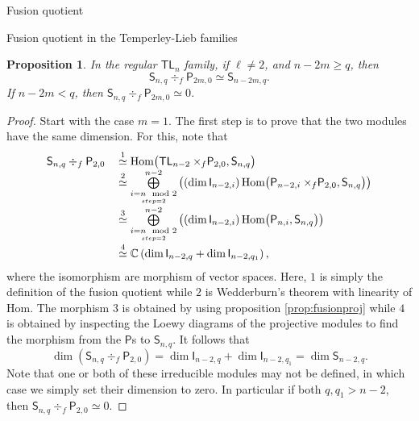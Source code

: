 \documentclass[reqno]{amsart}
\newtheorem{Prop}[Thm]{Proposition}
\newcommand{\tl}[1]{\mathsf{TL}_{#1}}
\newcommand{\ds}[1]{\mathsf S_{#1}}
\newcommand{\dl}[1]{\mathsf I_{#1}}
\newcommand{\dP}[1]{\mathsf P_{#1}}
\newcommand{\xf}{\times\hspace{-0.27em}_f}
\newcommand{\Hom}[1]{\text{\rm{Hom}}\big( #1 \big)}
\begin{document}
\begin{section}{Fusion quotient}
\begin{subsection}{Fusion quotient in the Temperley-Lieb families}
\begin{Prop}
In the regular $\tl{n}$ family, if $\ell \neq 2$, and $n- 2m \geq q $, then 
\begin{equation}
\ds{n,q}\div_{f} \dP{2m,0} \simeq \ds{n-2m,q}.
\end{equation}
If $n-2m < q$, then $\ds{n,q}\div_{f} \dP{2m,0}  \simeq 0$.
\end{Prop}
\begin{proof}
Start with the case $m=1$. The first step is to prove that the two modules have the same dimension. For this, note that
\begin{equation}
\begin{tabular}{r l}
 $\ds{n,q}\div_{f} \dP{2,0}$ &$ \overset{1}{\simeq} \Hom{\tl{n-2} \xf \dP{2,0}, \ds{n,q}}$\\
 &$ \overset{2}{\simeq} \overset{n-2}{\underset{\underset{step=2}{i=n \mod 2}}{\bigoplus}}\left( \left(\dim\dl{n-2,i}\right) \Hom{\dP{n-2,i} \xf \dP{2,0}, \ds{n,q}}\right)$\\
 &$ \overset{3}{\simeq} \overset{n-2}{\underset{\underset{step=2}{i=n \mod 2}}{\bigoplus}}\left( \left(\dim\dl{n-2,i}\right) \Hom{\dP{n,i}, \ds{n,q}}\right)$\\
 &$ \overset{4}{\simeq} \mathbb{C} \left(\dim \dl{n-2,q} + \dim \dl{n-2,q_{1}}\right),$
 \end{tabular}
\end{equation}
where the isomorphism are morphism of vector spaces. Here, $1$ is simply the definition of the fusion quotient while $2$ is Wedderburn's theorem with linearity of Hom. The morphism $3$ is obtained by using proposition \ref{prop:fusionproj} while $4$ is obtained by inspecting the Loewy diagrams of the projective modules to find the morphism from the $\mathsf{P}$s to $\ds{n,q}$. It follows that $$\dim (\ds{n,q} \div_{f}\dP{2,0}) = \dim \dl{n-2,q} + \dim \dl{n-2,q_{1}} = \dim \ds{n-2,q}.$$ Note that one or both of these irreducible modules may not be defined, in which case we simply set their dimension to zero. In particular if both $q,q_{1} > n-2$, then $\ds{n,q} \div_{f}\dP{2,0} \simeq 0$.


\end{proof}
\end{subsection}
\end{section}
\end{document}
